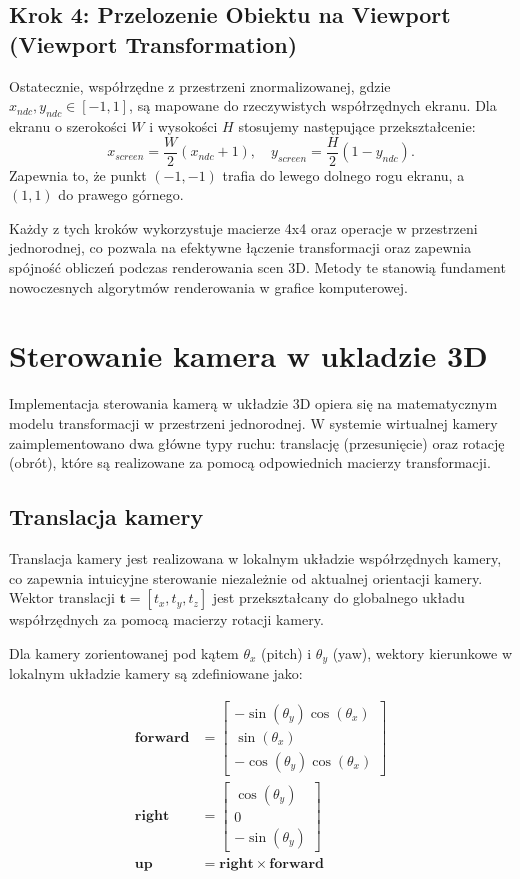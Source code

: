 \documentclass[a4paper,12pt]{article}
\begin{document}
\subsection{Krok 4: Przelozenie Obiektu na Viewport (Viewport Transformation)}
Ostatecznie, współrzędne z przestrzeni znormalizowanej, gdzie \( x_{ndc}, y_{ndc} \in [-1,1] \), są mapowane do rzeczywistych współrzędnych ekranu.
Dla ekranu o szerokości \( W \) i wysokości \( H \) stosujemy następujące przekształcenie:
\[
x_{screen} = \frac{W}{2} \left( x_{ndc} + 1 \right), \quad y_{screen} = \frac{H}{2} \left( 1 - y_{ndc} \right).
\]
Zapewnia to, że punkt \((-1,-1)\) trafia do lewego dolnego rogu ekranu, a \((1,1)\) do prawego górnego.

\bigskip

Każdy z tych kroków wykorzystuje macierze 4x4 oraz operacje w przestrzeni jednorodnej, co pozwala na efektywne łączenie transformacji oraz zapewnia spójność obliczeń podczas renderowania scen 3D. Metody te stanowią fundament nowoczesnych algorytmów renderowania w grafice komputerowej.

\section{Sterowanie kamera w ukladzie 3D}

Implementacja sterowania kamerą w układzie 3D opiera się na matematycznym modelu transformacji w przestrzeni jednorodnej. W systemie wirtualnej kamery zaimplementowano dwa główne typy ruchu: translację (przesunięcie) oraz rotację (obrót), które są realizowane za pomocą odpowiednich macierzy transformacji.

\subsection{Translacja kamery}

Translacja kamery jest realizowana w lokalnym układzie współrzędnych kamery, co zapewnia intuicyjne sterowanie niezależnie od aktualnej orientacji kamery. Wektor translacji \( \mathbf{t} = [t_x, t_y, t_z] \) jest przekształcany do globalnego układu współrzędnych za pomocą macierzy rotacji kamery.

Dla kamery zorientowanej pod kątem \( \theta_x \) (pitch) i \( \theta_y \) (yaw), wektory kierunkowe w lokalnym układzie kamery są zdefiniowane jako:

\begin{align*}
\mathbf{forward} &= \begin{bmatrix} -\sin(\theta_y) \cos(\theta_x) \\ \sin(\theta_x) \\ -\cos(\theta_y) \cos(\theta_x) \end{bmatrix} \\
\mathbf{right} &= \begin{bmatrix} \cos(\theta_y) \\ 0 \\ -\sin(\theta_y) \end{bmatrix} \\
\mathbf{up} &= \mathbf{right} \times \mathbf{forward}
\end{align*}
\end{document}
